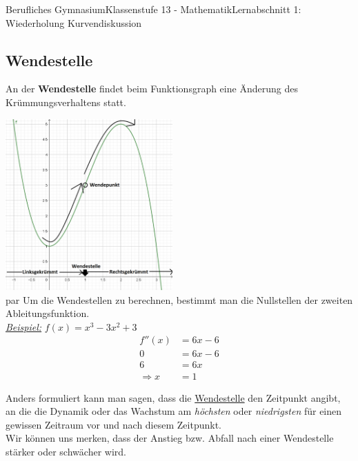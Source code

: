 \documentclass[11pt,twocolumn,oneside,openany,headings=optiontotoc,11pt,numbers=noenddot]{article}
\begin{document}
\begin{worksheet}{Berufliches Gymnasium}{Klassenstufe 13 - Mathematik}{Lernabschnitt 1: Wiederholung Kurvendiskussion}
		\subsection{Wendestelle}
		An der \textbf{Wendestelle} findet beim Funktionsgraph eine Änderung des Krümmungsverhaltens statt.\\
		\par\bigskip\noindent
		\includegraphics[width=0.48\textwidth]{../99_Bilder/00_Wdh/WP.png}\\
		par\bigskip\noindent
		Um die Wendestellen zu berechnen, bestimmt man die Nullstellen der zweiten Ableitungsfunktion.\\
		\textit{\underline{Beispiel:}} \(f(x) = x^3 - 3x^2 + 3\)
		\begin{align*}
			f''(x) & = 6x - 6\\
			0 & = 6x - 6\\
			6 & = 6x\\
			\Rightarrow x & = 1
		\end{align*}
		\begin{framed}
			\noindent
			Anders formuliert kann man sagen, dass die \underline{Wendestelle} den Zeitpunkt angibt, an die die Dynamik oder das Wachstum am \textit{höchsten} oder \textit{niedrigsten} für einen gewissen Zeitraum vor und nach diesem Zeitpunkt.\\
			Wir können uns merken, dass der Anstieg bzw. Abfall nach einer Wendestelle stärker oder schwächer wird.
		\end{framed}

\end{worksheet}
\end{document}
